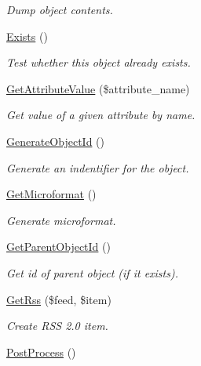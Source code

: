 \begin{CompactItemize}
\begin{CompactList}\small\item\em Dump object contents. \item\end{CompactList}\item 
\hyperlink{class_object_740e3ddfc03f8d18826fe6ed67344f0f}{Exists} ()
\begin{CompactList}\small\item\em Test whether this object already exists. \item\end{CompactList}\item 
\hyperlink{class_object_09d42d8bd63d8d7f9353b5087301b81c}{GetAttributeValue} (\$attribute\_\-name)
\begin{CompactList}\small\item\em Get value of a given attribute by name. \item\end{CompactList}\item 
\hyperlink{class_object_291597e1743bd57c40b8b49ae676e940}{GenerateObjectId} ()
\begin{CompactList}\small\item\em Generate an indentifier for the object. \item\end{CompactList}\item 
\hyperlink{class_object_28c07f4c361d113e21a934718c1edcc5}{GetMicroformat} ()
\begin{CompactList}\small\item\em Generate microformat. \item\end{CompactList}\item 
\hypertarget{class_object_3edf2de2a04b4388c1fb181b1bd7a3bd}{
\hyperlink{class_object_3edf2de2a04b4388c1fb181b1bd7a3bd}{GetParentObjectId} ()}
\label{class_object_3edf2de2a04b4388c1fb181b1bd7a3bd}

\begin{CompactList}\small\item\em Get id of parent object (if it exists). \item\end{CompactList}\item 
\hyperlink{class_object_bff7e02bed36f0396b0c388bc68f725c}{GetRss} (\$feed, \$item)
\begin{CompactList}\small\item\em Create RSS 2.0 item. \item\end{CompactList}\item 
\hypertarget{class_object_4ca6ebed0ef8d6b792fec824e3fbe0bc}{
\hyperlink{class_object_4ca6ebed0ef8d6b792fec824e3fbe0bc}{PostProcess} ()}
\label{class_object_4ca6ebed0ef8d6b792fec824e3fbe0bc}


\end{CompactItemize}
